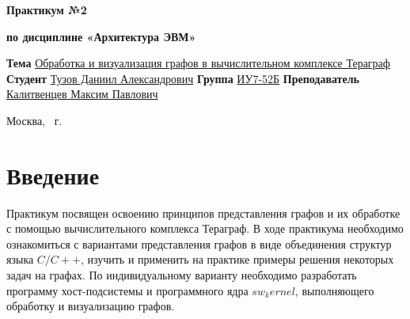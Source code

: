 \documentclass{article}
\begin{document}
\begin{titlepage}
	\noindent\begin{minipage}{1.0\textwidth}\centering
		\Large\textbf{       Практикум №2}
		\end{minipage}
		
	\noindent\begin{minipage}{1.0\textwidth}\centering
		\textbf{\newline}	
		\end{minipage}

	\noindent\begin{minipage}{1.0\textwidth}\centering
		\Large\textbf{по дисциплине «Архитектура ЭВМ»}	
		\end{minipage}
		
	\noindent\begin{minipage}{1.0\textwidth}\centering
		\Large\textbf{\newline\newline\newline\newline}	
		\end{minipage}
	
	\noindent\textbf{Тема} \underline{Обработка и визуализация графов в вычислительном комплексе Тераграф}
\newline\newline
	\textbf{Студент} \underline{Тузов Даниил Александрович}\newline\newline
	\textbf{Группа} \underline{ИУ7-52Б}\newline\newline
	\textbf{Преподаватель} \underline{Калитвенцев Максим Павлович}
	
	\begin{center}
		\vfill
		Москва, \the\year ~г.
	\end{center}
	\restoregeometry
	\clearpage
\end{titlepage}

\section{Введение}

Практикум посвящен освоению принципов представления графов и их обработке с помощью вычислительного комплекса 
Тераграф. В ходе практикума необходимо ознакомиться с вариантами представления графов в виде объединения структур языка 
$C/C++$, изучить и применить на практике примеры решения некоторых задач на графах. По индивидуальному варианту 
необходимо разработать программу хост-подсистемы и программного ядра $sw_kernel$, выполняющего обработку и 
визуализацию графов.
\end{document}
